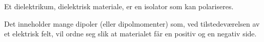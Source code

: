 Et dielektrikum, dielektrisk materiale, er en isolator som kan polariseres.

Det inneholder mange dipoler (eller dipolmomenter) som, ved tilstedeværelsen
av et elektrisk felt, vil ordne seg slik at materialet får en
positiv og en negativ side.

